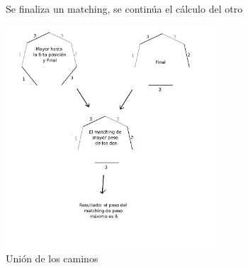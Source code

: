 \documentclass[a4paper, 12pt]{article}
\begin{document}
\begin{figure}[H]
\centering
{}
\qquad
{}
\caption{Se finaliza un matching, se continúa el cálculo del otro}
\end{figure}

\begin{figure}[H]
\centering
{}
\qquad
{}

\end{figure}

\begin{figure}[H]
\centering
\includegraphics[width=0.7\textwidth]{imagenes/pasosFinales.png} 
\caption{Unión de los caminos}
\end{figure}
\end{document}
